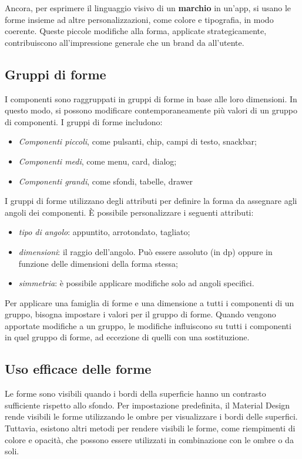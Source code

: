 \documentclass[12pt, a4paper]{report}
\begin{document}
	Ancora, per esprimere il linguaggio visivo di un \textbf{marchio} in un'app, si usano le forme insieme ad altre personalizzazioni, come colore e tipografia, in modo coerente.
	Queste piccole modifiche alla forma, applicate strategicamente, contribuiscono all'impressione generale che un brand da all’utente.


	\subsection{Gruppi di forme}
	I componenti sono raggruppati in gruppi di forme in base alle loro dimensioni. In questo modo, si possono modificare contemporaneamente più valori di un gruppo di componenti. I gruppi di forme includono:
	\begin{itemize}
		\item \textit{Componenti piccoli}, come pulsanti, chip, campi di testo, snackbar;
		\item \textit{Componenti medi}, come menu, card, dialog;
		\item \textit{Componenti grandi}, come sfondi, tabelle, drawer
	\end{itemize}


	I gruppi di forme utilizzano degli attributi per definire la forma da assegnare agli angoli dei componenti. È possibile personalizzare i seguenti attributi:
	\begin{itemize}
		\item \textit{tipo di angolo}: appuntito, arrotondato, tagliato;
		\item \textit{dimensioni}: il raggio dell'angolo. Può essere assoluto (in dp) oppure in funzione delle dimensioni della forma stessa;
		\item \textit{simmetria}: è possibile applicare modifiche solo ad angoli specifici.
	\end{itemize}

	Per applicare una famiglia di forme e una dimensione a tutti i componenti di un gruppo, bisogna impostare i valori per il gruppo di forme. Quando vengono apportate modifiche a un gruppo, le modifiche influiscono su tutti i componenti in quel gruppo di forme, ad eccezione di quelli con una sostituzione.

	\subsection{Uso efficace delle forme}
	Le forme sono visibili quando i bordi della superficie hanno un contrasto sufficiente rispetto allo sfondo. Per impostazione predefinita, il Material Design rende visibili le forme utilizzando le ombre per visualizzare i bordi delle superfici.
	Tuttavia, esistono altri metodi per rendere visibili le forme, come riempimenti di colore e opacità, che possono essere utilizzati in combinazione con le ombre o da soli.
\end{document}
